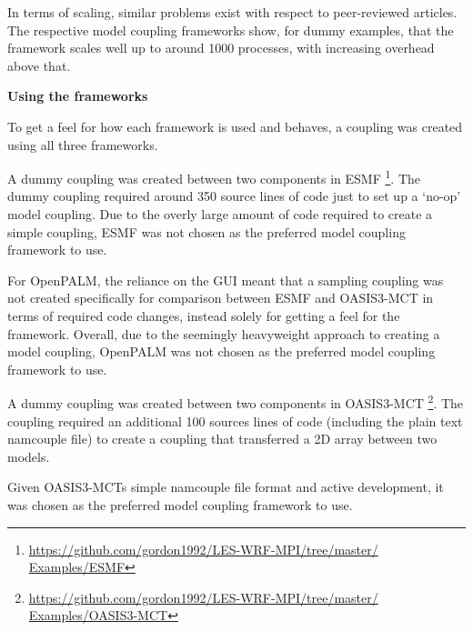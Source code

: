 In terms of scaling, similar problems exist with respect to peer-reviewed
articles. The respective model coupling frameworks show, for dummy examples,
that the framework scales well up to around 1000 processes, with increasing
overhead above that.

\textbf{Using the frameworks}

To get a feel for how each framework is used and behaves, a coupling was created
using all three frameworks.

A dummy coupling was created between two components in ESMF
\footnote{\url{https://github.com/gordon1992/LES-WRF-MPI/tree/master/
Examples/ESMF}}. The dummy coupling required around 350 source lines of code
just to set up a `no-op' model coupling. Due to the overly large amount of code
required to create a simple coupling, ESMF was not chosen as the preferred model
coupling framework to use.

For OpenPALM, the reliance on the GUI meant that a sampling coupling was not
created specifically for comparison between ESMF and OASIS3-MCT in terms of
required code changes, instead solely for getting a feel for the framework.
Overall, due to the seemingly heavyweight approach to creating a model coupling,
OpenPALM was not chosen as the preferred model coupling framework to use.

A dummy coupling was created between two components in OASIS3-MCT
\footnote{\url{https://github.com/gordon1992/LES-WRF-MPI/tree/master/
Examples/OASIS3-MCT}}. The coupling required an additional 100 sources lines of
code (including the plain text namcouple file) to create a coupling that
transferred a 2D array between two models.

Given OASIS3-MCTs simple namcouple file format and active development, it was
chosen as the preferred model coupling framework to use.
